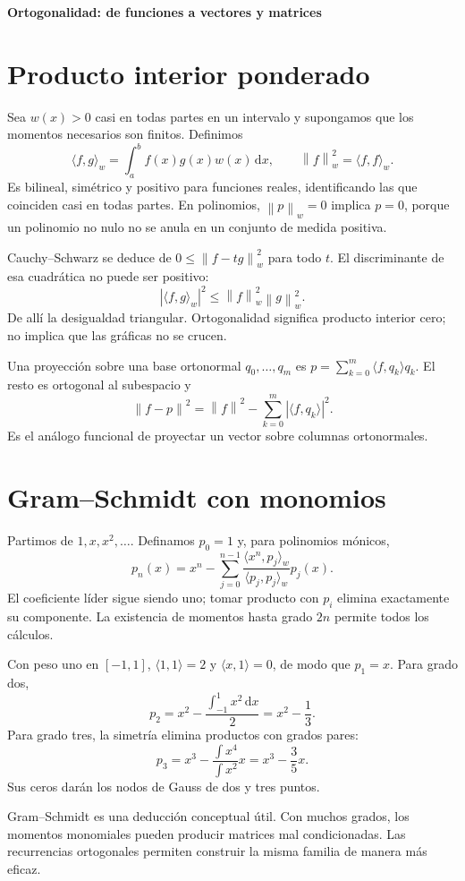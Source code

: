 \documentclass[11pt,a4paper]{article}
\newcommand{\dd}{\,\mathrm d}
\newcommand{\norm}[1]{\left\lVert #1\right\rVert}
\theoremstyle{definition}
\newcommand{\parte}[1]{\par\bigskip\Needspace{8\baselineskip}\begin{center}{\Large\bfseries\color{azul}#1}\end{center}}
\begin{document}
\parte{Ortogonalidad: de funciones a vectores y matrices}
\section{Producto interior ponderado}
Sea $w(x)>0$ casi en todas partes en un intervalo y supongamos que los momentos necesarios son finitos. Definimos
\[
\langle f,g\rangle_w=\int_a^b f(x)g(x)w(x)\dd x,\qquad
\norm f_w^2=\langle f,f\rangle_w.
\]
Es bilineal, simétrico y positivo para funciones reales, identificando las que coinciden casi en todas partes. En polinomios, $\norm p_w=0$ implica $p=0$, porque un polinomio no nulo no se anula en un conjunto de medida positiva.

Cauchy--Schwarz se deduce de $0\le\norm{f-tg}_w^2$ para todo $t$. El discriminante de esa cuadrática no puede ser positivo:
\[
|\langle f,g\rangle_w|^2\le\norm f_w^2\norm g_w^2.
\]
De allí la desigualdad triangular. Ortogonalidad significa producto interior cero; no implica que las gráficas no se crucen.

Una proyección sobre una base ortonormal $q_0,\ldots,q_m$ es
$p=\sum_{k=0}^m\langle f,q_k\rangle q_k$. El resto es ortogonal al subespacio y
\[
\norm{f-p}^2=\norm f^2-\sum_{k=0}^m|\langle f,q_k\rangle|^2.
\]
Es el análogo funcional de proyectar un vector sobre columnas ortonormales.

\section{Gram--Schmidt con monomios}
Partimos de $1,x,x^2,\ldots$. Definamos $p_0=1$ y, para polinomios mónicos,
\[
p_n(x)=x^n-\sum_{j=0}^{n-1}
\frac{\langle x^n,p_j\rangle_w}{\langle p_j,p_j\rangle_w}p_j(x).
\]
El coeficiente líder sigue siendo uno; tomar producto con $p_i$ elimina exactamente su componente. La existencia de momentos hasta grado $2n$ permite todos los cálculos.

Con peso uno en $[-1,1]$, $\langle1,1\rangle=2$ y $\langle x,1\rangle=0$, de modo que $p_1=x$. Para grado dos,
\[
p_2=x^2-\frac{\int_{-1}^1x^2\dd x}{2}=x^2-\frac13.
\]
Para grado tres, la simetría elimina productos con grados pares:
\[
p_3=x^3-\frac{\int x^4}{\int x^2}x=x^3-\frac35x.
\]
Sus ceros darán los nodos de Gauss de dos y tres puntos.

Gram--Schmidt es una deducción conceptual útil. Con muchos grados, los momentos monomiales pueden producir matrices mal condicionadas. Las recurrencias ortogonales permiten construir la misma familia de manera más eficaz.
\end{document}

